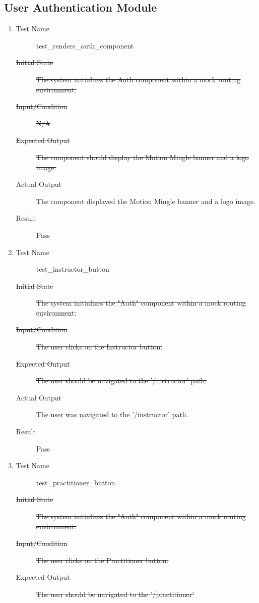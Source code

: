 \documentclass[12pt, titlepage]{article}
\begin{document}
\subsection{User Authentication Module}
\begin{enumerate}[UT-UA1]
\item \label{UT-UA1}
  \begin{description}
  \item[Test Name] test\_renders\_auth\_component
  \item[\sout{Initial State}]\sout{ The system initializes the Auth component within a mock
    routing environment.
  }
		\item[\sout{Input/Condition}]\sout{ N/A
  }
		\item[\sout{Expected Output}]\sout{ The component should display the Motion Mingle banner
    and a logo image.
  }
		\item[Actual Output] The component displayed the Motion Mingle banner and a
    logo image.
  \item[Result] Pass
  \end{description}
\item \label{UT-UA2}
  \begin{description}
  \item[Test Name] test\_instructor\_button
  \item[\sout{Initial State}]\sout{ The system initializes the "Auth" component within a mock
    routing environment.
  }
		\item[\sout{Input/Condition}]\sout{ The user clicks on the Instructor button.
  }
		\item[\sout{Expected Output}]\sout{ The user should be navigated to the '/instructor' path.
  }
		\item[Actual Output] The user was navigated to the '/instructor' path.
  \item[Result] Pass
  \end{description}
\item \label{UT-UA3}
  \begin{description}
  \item[Test Name] test\_practitioner\_button
  \item[\sout{Initial State}]\sout{ The system initializes the "Auth" component within a mock
    routing environment.
  }
		\item[\sout{Input/Condition}]\sout{ The user clicks on the Practitioner button.
  }
		\item[\sout{Expected Output}]\sout{ The user should be navigated to the '/practitioner'
}
\end{description}
\end{enumerate}
\end{document}
